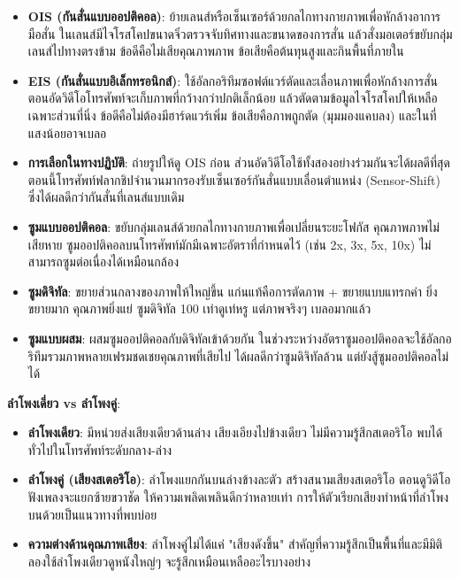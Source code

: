 \begin{itemize}
  \item \textbf{OIS (กันสั่นแบบออปติคอล)}: ย้ายเลนส์หรือเซ็นเซอร์ด้วยกลไกทางกายภาพเพื่อหักล้างอาการมือสั่น ในเลนส์มีไจโรสโคปขนาดจิ๋วตรวจจับทิศทางและขนาดของการสั่น แล้วสั่งมอเตอร์ขยับกลุ่มเลนส์ไปทางตรงข้าม ข้อดีคือไม่เสียคุณภาพภาพ ข้อเสียคือต้นทุนสูงและกินพื้นที่ภายใน
  \item \textbf{EIS (กันสั่นแบบอิเล็กทรอนิกส์)}: ใช้อัลกอริทึมซอฟต์แวร์ตัดและเลื่อนภาพเพื่อหักล้างการสั่น ตอนอัดวิดีโอโทรศัพท์จะเก็บภาพที่กว้างกว่าปกติเล็กน้อย แล้วตัดตามข้อมูลไจโรสโคปให้เหลือเฉพาะส่วนที่นิ่ง ข้อดีคือไม่ต้องมีฮาร์ดแวร์เพิ่ม ข้อเสียคือภาพถูกตัด (มุมมองแคบลง) และในที่แสงน้อยอาจเบลอ
  \item \textbf{การเลือกในทางปฏิบัติ}: ถ่ายรูปให้ดู OIS ก่อน ส่วนอัดวิดีโอใช้ทั้งสองอย่างร่วมกันจะได้ผลดีที่สุด ตอนนี้โทรศัพท์ฟลากชิปจำนวนมากรองรับเซ็นเซอร์กันสั่นแบบเลื่อนตำแหน่ง (Sensor-Shift) ซึ่งได้ผลดีกว่ากันสั่นที่เลนส์แบบเดิม
\end{itemize}


\begin{itemize}
  \item \textbf{ซูมแบบออปติคอล}: ขยับกลุ่มเลนส์ด้วยกลไกทางกายภาพเพื่อเปลี่ยนระยะโฟกัส คุณภาพภาพไม่เสียหาย ซูมออปติคอลบนโทรศัพท์มักมีเฉพาะอัตราที่กำหนดไว้ (เช่น 2x, 3x, 5x, 10x) ไม่สามารถซูมต่อเนื่องได้เหมือนกล้อง
  \item \textbf{ซูมดิจิทัล}: ขยายส่วนกลางของภาพให้ใหญ่ขึ้น แก่นแท้คือการตัดภาพ + ขยายแบบแทรกค่า ยิ่งขยายมาก คุณภาพยิ่งแย่ ซูมดิจิทัล 100 เท่าดูเท่หรู แต่ภาพจริงๆ เบลอมากแล้ว
  \item \textbf{ซูมแบบผสม}: ผสมซูมออปติคอลกับดิจิทัลเข้าด้วยกัน ในช่วงระหว่างอัตราซูมออปติคอลจะใช้อัลกอริทึมรวมภาพหลายเฟรมชดเชยคุณภาพที่เสียไป ได้ผลดีกว่าซูมดิจิทัลล้วน แต่ยังสู้ซูมออปติคอลไม่ได้
\end{itemize}


\textbf{ลำโพงเดี่ยว vs ลำโพงคู่}:

\begin{itemize}
  \item \textbf{ลำโพงเดียว}: มีหน่วยส่งเสียงเดียวด้านล่าง เสียงเอียงไปข้างเดียว ไม่มีความรู้สึกสเตอริโอ พบได้ทั่วไปในโทรศัพท์ระดับกลาง-ล่าง
  \item \textbf{ลำโพงคู่ (เสียงสเตอริโอ)}: ลำโพงแยกกันบนล่างข้างละตัว สร้างสนามเสียงสเตอริโอ ตอนดูวิดีโอฟังเพลงจะแยกซ้ายขวาชัด ให้ความเพลิดเพลินดีกว่าหลายเท่า การให้ตัวเรียกเสียงทำหน้าที่ลำโพงบนด้วยเป็นแนวทางที่พบบ่อย
  \item \textbf{ความต่างด้านคุณภาพเสียง}: ลำโพงคู่ไม่ได้แค่ "เสียงดังขึ้น" สำคัญที่ความรู้สึกเป็นพื้นที่และมีมิติ ลองใช้ลำโพงเดียวดูหนังใหญ่ๆ จะรู้สึกเหมือนเหลืออะไรบางอย่าง
\end{itemize}

